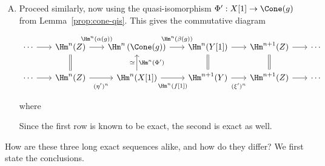 \begin{enumerate}[(A)]
	\item Proceed similarly, now using the quasi-isomorphism
	$\Phi':X[1]\to\Cone(g)$ from Lemma~\ref{prop:cone-qis}. This gives the
	commutative diagram
	\[\begin{tikzcd}[column sep=scriptsize]
		\cdots \arrow[r] & \Hm^n(Z) \arrow[r, "{\Hm^n(\alpha(g))}" inner sep=0.6em] & \Hm^n\left( \Cone(g) \right) \arrow[r, "{\Hm^n(\beta(g))}" inner sep=0.6em] & \Hm^n(Y[1]) \arrow[r] & \Hm^{n+1}(Z) \arrow[r] & \cdots \\
		\cdots \arrow[r] & \Hm^n(Z) \arrow[r, "{(\eta')^n}"' inner sep=0.6em] \arrow[equal, u] & \Hm^n(X[1]) \arrow[r, "{\Hm^n(f[1])}"' inner sep=0.6em] \arrow[u, "{\Hm^n(\Phi')}"', "\simeq"] & \Hm^{n+1}(Y) \arrow[r, "{(\xi')^n}"' inner sep=0.6em] \arrow[equal, u] & \Hm^{n+1}(Z) \arrow[r] \arrow[equal, u] & \cdots
	\end{tikzcd}\]
	where
	Since the first row is known to be exact, the second is exact as well.
\end{enumerate}

How are these three long exact sequences alike, and how do they differ? We
first state the conclusions.


